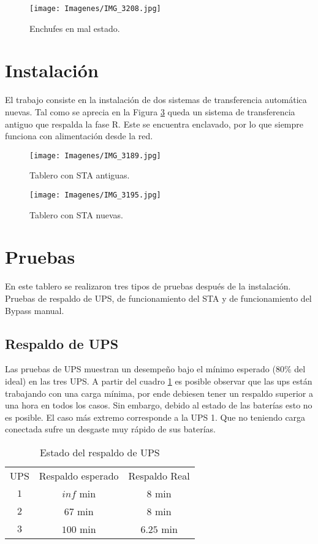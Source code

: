 \documentclass{article}
\begin{document}
\begin{figure} [H]
\centering
\texttt{[image: Imagenes/IMG\_3208.jpg]}
\caption{\label{fig:enchufe1ensala}Enchufes en mal estado.}
\end{figure}

\newpage
\section{Instalación}
El trabajo consiste en la instalación de dos sistemas de transferencia automática nuevas. 
Tal como se aprecia en la Figura \ref{fig:Sistemas de transferencia nuevas} queda un sistema de transferencia antiguo que respalda la fase R. Este se encuentra enclavado, por lo que siempre funciona con alimentación desde la red.

\begin{figure}[H]
\centering
\texttt{[image: Imagenes/IMG\_3189.jpg]}
\caption{\label{fig:Sistemas de transferencia antiguas}Tablero con STA antiguas.}
\end{figure}

\begin{figure} [H]
\centering
\texttt{[image: Imagenes/IMG\_3195.jpg]}
\caption{\label{fig:Sistemas de transferencia nuevas}Tablero con STA nuevas.}
\end{figure}


\section{Pruebas}
En este tablero se realizaron tres tipos de pruebas después de la instalación. Pruebas de respaldo de UPS, de funcionamiento del STA y de funcionamiento del Bypass manual.

\subsection{Respaldo de UPS}

Las pruebas de UPS muestran un desempeño bajo el mínimo esperado (80\% del ideal) en las tres UPS.
A partir del cuadro \ref{tab:respaldoUPS} es posible observar que las ups están trabajando con una carga mínima, por ende debiesen tener un respaldo superior a una hora en todos los casos. Sin embargo, debido al estado de las baterías esto no es posible. El caso más extremo corresponde a la UPS 1. Que no teniendo carga conectada sufre un desgaste muy rápido de sus baterías.

\begin{center}
    \begin{table}[H]
        \centering
        \begin{tabular}{c c c}
            UPS & Respaldo esperado & Respaldo Real \\
             $1$ & $inf$ min & $8$ min \\
             $2$ & $67$ min & $8$ min \\
             $3$ & $100$ min & $6.25$ min
        \end{tabular}
        \caption{Estado del respaldo de UPS}
        \label{tab:respaldoUPS}
    \end{table}
\end{center}
\end{document}
